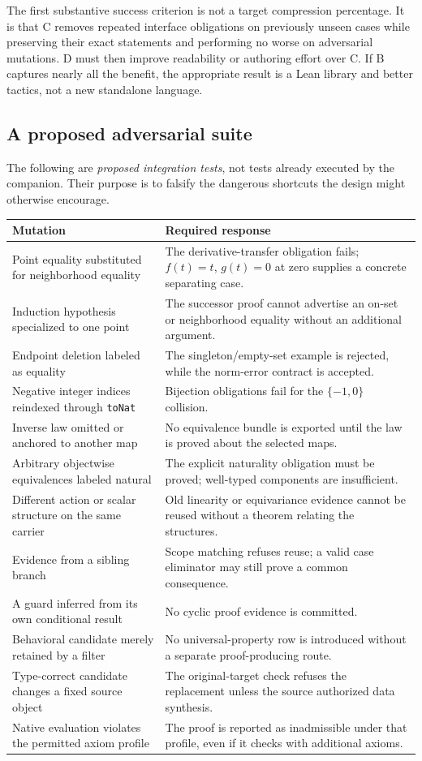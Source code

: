 \documentclass[11pt,letterpaper]{article}
\newcommand{\code}[1]{\nolinkurl{#1}}
\theoremstyle{definition}
\theoremstyle{remark}
\begin{document}
The first substantive success criterion is not a target compression percentage.
It is that C removes repeated interface obligations on previously unseen cases
while preserving their exact statements and performing no worse on adversarial
mutations. D must then improve readability or authoring effort over C. If B
captures nearly all the benefit, the appropriate result is a Lean library and
better tactics, not a new standalone language.

\subsection{A proposed adversarial suite}
The following are \emph{proposed integration tests}, not tests already executed
by the companion. Their purpose is to falsify the dangerous shortcuts the design
might otherwise encourage.

\begin{longtable}{@{}P{.32\linewidth}P{.62\linewidth}@{}}
\toprule Mutation & Required response\\\midrule
\endhead
Point equality substituted for neighborhood equality & The derivative-transfer
obligation fails; $f(t)=t$, $g(t)=0$ at zero supplies a concrete separating case.\\
Induction hypothesis specialized to one point & The successor proof cannot
advertise an on-set or neighborhood equality without an additional argument.\\
Endpoint deletion labeled as equality & The singleton/empty-set example is
rejected, while the norm-error contract is accepted.\\
Negative integer indices reindexed through \code{toNat} & Bijection obligations
fail for the $\{-1,0\}$ collision.\\
Inverse law omitted or anchored to another map & No equivalence bundle is
exported until the law is proved about the selected maps.\\
Arbitrary objectwise equivalences labeled natural & The explicit naturality
obligation must be proved; well-typed components are insufficient.\\
Different action or scalar structure on the same carrier & Old linearity or
equivariance evidence cannot be reused without a theorem relating the structures.\\
Evidence from a sibling branch & Scope matching refuses reuse; a valid case
eliminator may still prove a common consequence.\\
A guard inferred from its own conditional result & No cyclic proof evidence is
committed.\\
Behavioral candidate merely retained by a filter & No universal-property row is
introduced without a separate proof-producing route.\\
Type-correct candidate changes a fixed source object & The original-target
check refuses the replacement unless the source authorized data synthesis.\\
Native evaluation violates the permitted axiom profile & The proof is reported
as inadmissible under that profile, even if it checks with additional axioms.\\
\bottomrule
\end{longtable}
\end{document}
